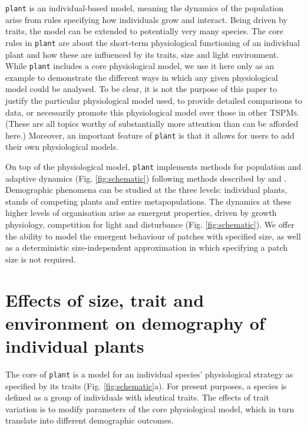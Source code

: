 \documentclass[a4paper,11pt]{article}
\newcommand{\plant}{\texttt{plant}}
\begin{document}
{\plant} is an individual-based model, meaning the dynamics of the
population arise from rules specifying how individuals grow and interact. 
Being driven by traits, the model can be extended to potentially very many species. The
core rules in {\plant} are about the short-term physiological
functioning of an individual plant and how these are influenced by its
traits, size and light environment.  While {\plant}
includes a core physiological model, we use it here only as an example to
demonstrate the different ways in which any given physiological model
could be analysed. To be clear, it is not the purpose
of this paper to justify the particular physiological model used, to provide detailed
comparisons to data, or necessarily promote this physiological model over
those in other \textsc{TSPMs}. (These are all topics worthy of
substantially more attention than can be afforded here.) Moreover, an important
feature of {\plant} is that it allows for users to add their own
physiological models.

On top of the physiological model, {\plant} implements methods for
population and adaptive dynamics (Fig.  \ref{fig:schematic}) following methods
described by \citet{Falster-2011} and \citet{Falster-2015}. Demographic
phenomena can be studied at the three levels: individual plants, stands of
competing plants and entire metapopulations. The dynamics at these higher
levels of organisation arise as emergent properties, driven by growth
physiology, competition for light and disturbance (Fig.  \ref{fig:schematic}).
We offer the ability to model the emergent behaviour of patches with
specified size, as well as a deterministic size-independent approximation
in which specifying a patch size is not required.

\section{Effects of size, trait and environment on demography of individual plants}

The core of {\plant} is a model for an individual species' physiological
strategy as specified by its traits (Fig. \ref{fig:schematic}a). For
present purposes, a species is defined as a group of individuals with identical
traits. The effects of trait variation is to modify parameters of the core
physiological model, which in turn translate into different demographic outcomes.
\end{document}
